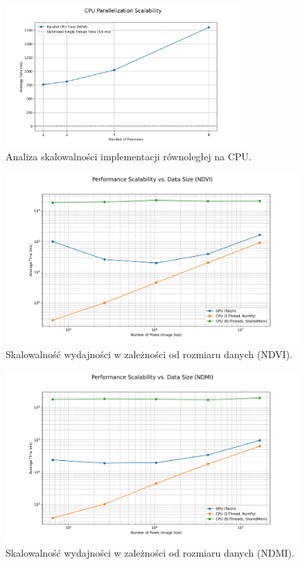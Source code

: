 \documentclass[12pt,a4paper]{article}
\begin{document}
\begin{figure}[H]
    \centering
    \includegraphics[width=0.8\textwidth]{charts/02_cpu_scalability.png}
    \caption{Analiza skalowalności implementacji równoległej na CPU.}
    \label{fig:cpu_scaling}
\end{figure}

\begin{figure}[H]
    \centering
    \includegraphics[width=\textwidth]{charts/03_size_scalability_ndvi.png}
    \caption{Skalowalność wydajności w zależności od rozmiaru danych (NDVI).}
    \label{fig:size_scaling_ndvi}
\end{figure}

\begin{figure}[H]
    \centering
    \includegraphics[width=\textwidth]{charts/04_size_scalability_ndmi.png}
    \caption{Skalowalność wydajności w zależności od rozmiaru danych (NDMI).}
    \label{fig:size_scaling_ndmi}
\end{figure}
\end{document}
